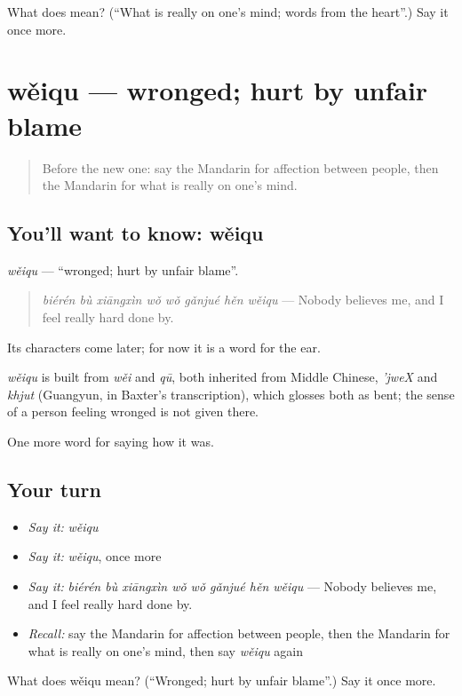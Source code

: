 \begin{tcolorbox}[breakable,colback=teal!4,colframe=teal!35!black,title={Before you move on}]
What does  mean? (\textquotedblleft{}What is really on one's mind; words from the heart\textquotedblright{}.) Say it once more.
\end{tcolorbox}
\section[wěiqu]{wěiqu — wronged; hurt by unfair blame}

\label{lesson:ZH-C459-weiqu}



\begin{quote}
Before the new one: say the Mandarin for affection between people, then the Mandarin for what is really on one's mind.
\end{quote}

\subsection*{You'll want to know: wěiqu}
\emph{wěiqu} — \textquotedblleft{}wronged; hurt by unfair blame\textquotedblright{}.

\begin{quote}
\emph{biérén bù xiāngxìn wǒ wǒ gǎnjué hěn wěiqu} — Nobody believes me, and I feel really hard done by.
\end{quote}

Its characters come later; for now it is a word for the ear.

\begin{cousinweb}
\emph{wěiqu} is built from \emph{wěi} and \emph{qū}, both inherited from Middle Chinese, \emph{'jweX} and \emph{khjut} (Guangyun, in Baxter's transcription), which glosses both as bent; the sense of a person feeling wronged is not given there.
\end{cousinweb}

\begin{grammarlens}[title={What you've built}]
One more word for saying how it was.
\end{grammarlens}

\subsection*{Your turn}
\begin{itemize}
\raggedright
  \item \emph{Say it:} \emph{wěiqu}
  \item \emph{Say it:} \emph{wěiqu}, once more
  \item \emph{Say it:} \emph{biérén bù xiāngxìn wǒ wǒ gǎnjué hěn wěiqu} — Nobody believes me, and I feel really hard done by.
  \item \emph{Recall:} say the Mandarin for affection between people, then the Mandarin for what is really on one's mind, then say \emph{wěiqu} again
\end{itemize}

\begin{tcolorbox}[breakable,colback=teal!4,colframe=teal!35!black,title={Before you move on}]
What does wěiqu mean? (\textquotedblleft{}Wronged; hurt by unfair blame\textquotedblright{}.) Say it once more.
\end{tcolorbox}
